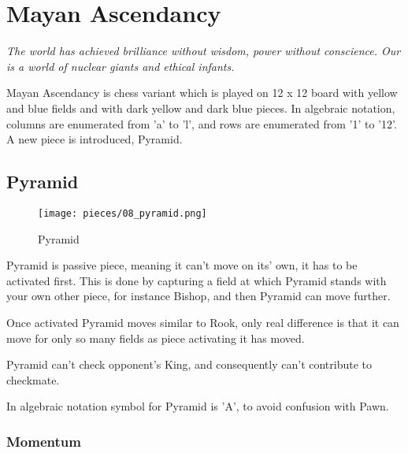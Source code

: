 
\chapter*{Mayan Ascendancy}

\begin{flushright}
\parbox{0.8\textwidth}{
\emph{The world has achieved brilliance without wisdom, power without
conscience. Our is a world of nuclear giants and ethical infants. \\
 } }
\end{flushright}

\noindent
Mayan Ascendancy is chess variant which is played on 12 x 12 board with
yellow and blue fields and with dark yellow and dark blue pieces. In
algebraic notation, columns are enumerated from 'a' to 'l', and rows are
enumerated from '1' to '12'. A new piece is introduced, Pyramid.

\clearpage

\section*{Pyramid}

\noindent
\begin{wrapfigure}[12]{l}{0.4\textwidth}
\texttt{[image: pieces/08\_pyramid.png]}
\caption{Pyramid}
\label{fig:pyramid}
\end{wrapfigure}
Pyramid is passive piece, meaning it can't move on its' own, it has to be
activated first. This is done by capturing a field at which Pyramid stands
with your own other piece, for instance Bishop, and then Pyramid can move
further.

Once activated Pyramid moves similar to Rook, only real difference is that
it can move for only so many fields as piece activating it has moved.

Pyramid can't check opponent's King, and consequently can't contribute to
checkmate.

In algebraic notation symbol for Pyramid is 'A', to avoid confusion with Pawn.

\subsection*{Momentum}

